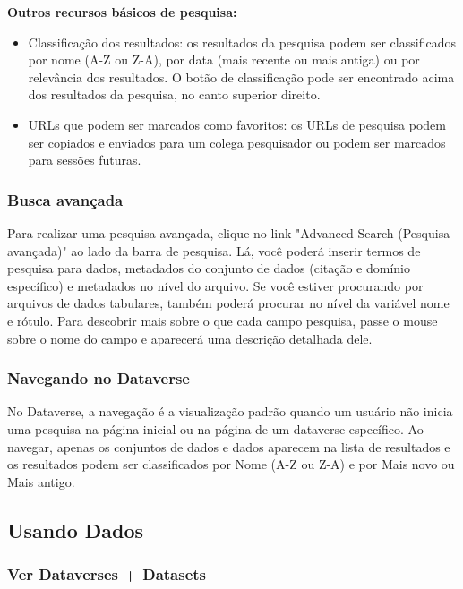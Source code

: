 \documentclass[12pt,hidelinks]{article}
\begin{document}
\textbf{Outros recursos básicos de pesquisa:}

\begin{itemize}
\item Classificação dos resultados: os resultados da pesquisa podem ser classificados por nome (A-Z ou Z-A), por data (mais recente ou mais antiga) ou por relevância dos resultados. O botão de classificação pode ser encontrado acima dos resultados da pesquisa, no canto superior direito.
\item URLs que podem ser marcados como favoritos: os URLs de pesquisa podem ser copiados e enviados para um colega pesquisador ou podem ser marcados para sessões futuras.
\end{itemize}
	        
	    \subsubsection{Busca avançada}
	    
\qquad Para realizar uma pesquisa avançada, clique no link "Advanced Search (Pesquisa avançada)" ao lado da barra de pesquisa. Lá, você poderá inserir termos de pesquisa para dados, metadados do conjunto de dados (citação e domínio específico) e metadados no nível do arquivo. Se você estiver procurando por arquivos de dados tabulares, também poderá procurar no nível da variável nome e rótulo. Para descobrir mais sobre o que cada campo pesquisa, passe o mouse sobre o nome do campo e aparecerá uma descrição detalhada dele.
	    
	    \subsubsection{Navegando no Dataverse}
	    
\qquad No Dataverse, a navegação é a visualização padrão quando um usuário não inicia uma pesquisa na página inicial ou na página de um dataverse específico. Ao navegar, apenas os conjuntos de dados e dados aparecem na lista de resultados e os resultados podem ser classificados por Nome (A-Z ou Z-A) e por Mais novo ou Mais antigo.
	    
	\subsection{Usando Dados}
	
	    \subsubsection{Ver Dataverses + Datasets}
	    
\end{document}

